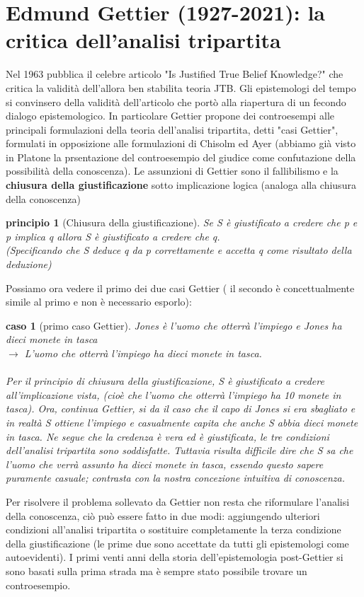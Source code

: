 \documentclass[10pt,a4paper]{article}
\newtheorem{caso}{caso}
\newtheorem{principio}{principio}
\begin{document}
\section{Edmund Gettier (1927-2021): la critica dell'analisi tripartita}
Nel 1963 pubblica il celebre articolo "Is Justified True Belief Knowledge?" che critica la validità dell'allora ben stabilita teoria JTB. Gli epistemologi del tempo si convinsero della validità dell'articolo che portò alla riapertura di un fecondo dialogo epistemologico. In particolare Gettier propone dei controesempi alle principali formulazioni della teoria dell'analisi tripartita, detti "casi Gettier", formulati in opposizione alle formulazioni di Chisolm ed Ayer (abbiamo già visto in Platone la prsentazione del controesempio del giudice come confutazione della possibilità della conoscenza). Le assunzioni di Gettier sono il fallibilismo e la \textbf{chiusura della giustificazione} sotto implicazione logica (analoga alla chiusura della conoscenza)
\begin{principio}[Chiusura della giustificazione]
	Se S è giustificato a credere che p e p implica q allora S è giustificato a credere che q.\\
	(Specificando che S deduce q da p correttamente e accetta q come risultato della deduzione)
\end{principio}
Possiamo ora vedere il primo dei due casi Gettier ( il secondo è concettualmente simile al primo e non è necessario esporlo):
\begin{caso}[primo caso Gettier]	\textit{Jones è l'uomo che otterrà l'impiego e Jones ha dieci monete in tasca}\\
	\(\rightarrow\) \textit{L'uomo che otterrà l'impiego ha dieci monete in tasca.}\\\\
	Per il principio di chiusura della giustificazione, S è giustificato a credere all'implicazione vista, (cioè che l'uomo che otterrà l'impiego ha 10 monete in tasca). Ora, continua Gettier, si da il caso che il capo di Jones si era sbagliato e in realtà S ottiene l'impiego e casualmente capita che anche S abbia dieci monete in tasca. Ne segue che la credenza è vera ed è giustificata, le tre condizioni dell'analisi tripartita sono soddisfatte. Tuttavia risulta difficile dire che S sa che l'uomo che verrà assunto ha dieci monete in tasca, essendo questo sapere puramente casuale; contrasta con la nostra concezione intuitiva di conoscenza.
\end{caso}

Per risolvere il problema sollevato da Gettier non resta che riformulare l'analisi della conoscenza, ciò può essere fatto in due modi: aggiungendo ulteriori condizioni all'analisi tripartita o sostituire completamente la terza condizione della giustificazione (le prime due sono accettate da tutti gli epistemologi come autoevidenti). I primi venti anni della storia dell'epistemologia post-Gettier si sono basati sulla prima strada ma è sempre stato possibile trovare un controesempio.
\newpage
\end{document}
